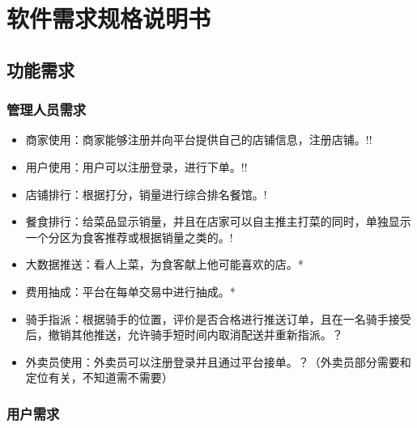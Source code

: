 \chapter{软件需求规格说明书}

\section{功能需求}

\subsection{管理人员需求}
\begin{itemize}
    \item{商家使用}：商家能够注册并向平台提供自己的店铺信息，注册店铺。!!
    \item{用户使用}：用户可以注册登录，进行下单。!!
    \item{店铺排行}：根据打分，销量进行综合排名餐馆。!
    \item{餐食排行}：给菜品显示销量，并且在店家可以自主推主打菜的同时，单独显示一个分区为食客推荐或根据销量之类的。!
    
    \item{大数据推送}：看人上菜，为食客献上他可能喜欢的店。*
    \item{费用抽成}：平台在每单交易中进行抽成。*
    
    \item{骑手指派}：根据骑手的位置，评价是否合格进行推送订单，且在一名骑手接受后，撤销其他推送，允许骑手短时间内取消配送并重新指派。？
    \item{外卖员使用}：外卖员可以注册登录并且通过平台接单。？（外卖员部分需要和定位有关，不知道需不需要）
\end{itemize}


\subsection{用户需求}
